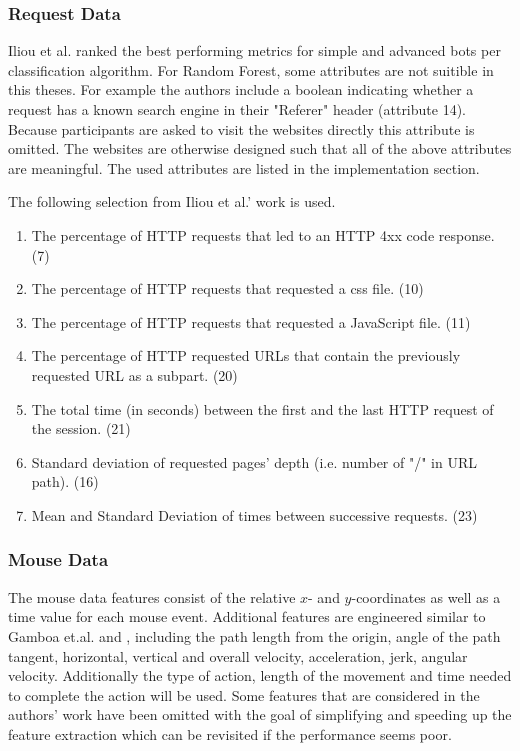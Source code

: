 \documentclass[
    fontsize=12pt,
    headings=small,
    parskip=half,           %
    bibliography=totoc,
    numbers=noenddot,       %
    open=any,               %
    final,                   %
    table
]{scrreprt}
\begin{document}
\label{concept_request_data}
\subsubsection{Request Data}

Iliou et al. \cite{10.1145/3339252.3339267} ranked the best performing metrics for simple and advanced bots per classification algorithm. For Random Forest, some attributes are not suitible in this theses. For example the authors include a boolean indicating whether a request has a known search engine in their "Referer" header (attribute 14). Because participants are asked to visit the websites directly this attribute is omitted. The websites are otherwise designed such that all of the above attributes are meaningful. The used attributes are listed in the implementation section.

The following selection from Iliou et al.' work \cite{10.1145/3339252.3339267} is used.

\begin{enumerate}
    \item The percentage of HTTP requests that led to an HTTP 4xx code response. (7)
    \item The percentage of HTTP requests that requested a css file. (10)
    \item The percentage of HTTP requests that requested a JavaScript file. (11)
    \item The percentage of HTTP requested URLs that contain the previously requested URL as a subpart. (20)
    \item The total time (in seconds) between the first and the last HTTP request of the session. (21)
    \item Standard deviation of requested pages' depth (i.e. number of "/" in URL path). (16)
    \item Mean and Standard Deviation of times between successive requests. (23)
\end{enumerate}

\label{concept_mouse_data}
\subsubsection{Mouse Data}

The mouse data features consist of the relative $x$- and $y$-coordinates as well as a time value for each mouse event. Additional features are engineered similar to Gamboa et.al.\cite{GAMBOA2004} and \cite{https://doi.org/10.1049/iet-bmt.2018.5126}, including the path length from the origin, angle of the path tangent, horizontal, vertical and overall velocity, acceleration, jerk, angular velocity. Additionally the type of action, length of the movement and time needed to complete the action will be used. Some features that are considered in the authors' work have been omitted with the goal of simplifying and speeding up the feature extraction which can be revisited if the performance seems poor.
\end{document}

